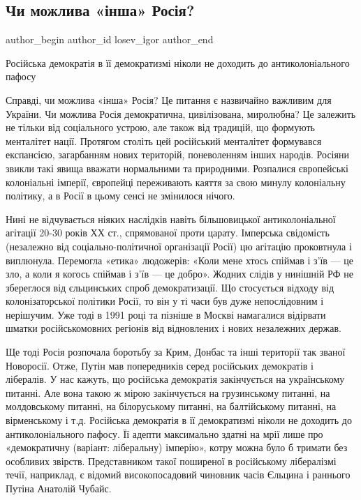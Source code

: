  
 
 
 
 
\subsection{Чи можлива «інша» Росія?}
\label{sec:13_01_2022.stz.news.ua.den.1.insha_rossia}

\ifcmt
 author_begin
   author_id losev_іgor
 author_end
\fi

\begin{zznagolos}
Російська демократія в її демократизмі ніколи не доходить до антиколоніального пафосу	
\end{zznagolos}

Справді, чи можлива «інша» Росія? Це питання є назвичайно важливим для України.
Чи можлива Росія демократична, цивілізована, миролюбна? Це залежить не тільки
від соціального устрою, але також від традицій, що формують менталітет нації.
Протягом століть цей російський менталітет формувався експансією, загарбанням
нових територій, поневоленням інших народів. Росіяни звикли такі явища вважати
нормальними та природними. Розпалися європейські колоніальні імперії, європейці
переживають каяття за свою минулу колоніальну політику, а в Росії в цьому сенсі
не змінилося нічого.

Нині не відчувається ніяких наслідків навіть більшовицької антиколоніальної
агітації 20-30 років ХХ ст., спрямованої проти царату. Імперська свідомість
(незалежно від соціально-політичної організації Росії) цю агітацію проковтнула
і виплюнула. Перемогла «етика» людожерів: «Коли мене хтось спіймав і з’їв — це
зло, а коли я когось спіймав і з’їв — це добро». Жодних слідів у нинішній РФ не
збереглося від єльцинських спроб демократизації. Що стосується відходу від
колонізаторської політики Росії, то він у ті часи був дуже непослідовним і
нерішучим. Уже тоді в 1991 році та пізніше в Москві намагалися відірвати шматки
російськомовних регіонів від відновлених і нових незалежних держав.

Ще тоді Росія розпочала боротьбу за Крим, Донбас та інші території так званої
Новоросії. Отже, Путін мав попередників серед російських демократів і
лібералів. У нас кажуть, що російська демократія закінчується на українському
питанні. Але вона такою ж мірою закінчується на грузинському питанні, на
молдовському питанні, на білоруському питанні, на балтійському питанні, на
вірменському і т.д. Російська демократія в її демократизмі ніколи не доходить
до антиколоніального пафосу. Її адепти максимально здатні на мрії лише про
«демократичну (варіант: ліберальну) імперію», котру можна було б тримати без
особливих звірств. Представником такої поширеної в російському лібералізмі
течії, наприклад, є відомий високопосадовий чиновник часів Єльцина і раннього
Путіна Анатолій Чубайс.

